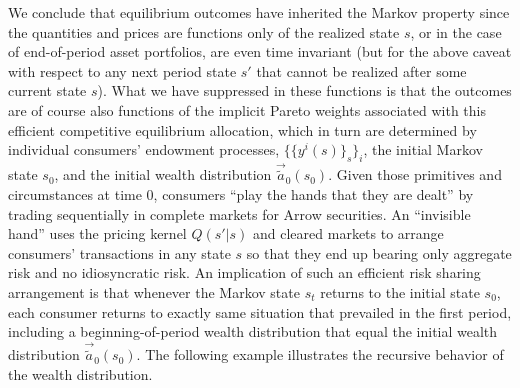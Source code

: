  
We conclude that equilibrium outcomes have
inherited the Markov property since the 
quantities and prices are functions only of 
the realized state $s$, or in the case of 
end-of-period asset portfolios, are even 
time invariant (but for the above caveat with 
respect to any next period state $s'$ that 
cannot be realized after some current 
state $s$).
What we have suppressed in these functions is 
that the outcomes are of course also functions 
of the implicit Pareto weights associated
with this efficient competitive equilibrium 
allocation, which in turn are determined by 
individual consumers' endowment processes, 
$\{\{y^i(s)\}_s\}_i$, the initial Markov 
state $s_0$, and the initial wealth distribution
$\vec {\tilde a}_0(s_0)$. Given those primitives 
and circumstances at time 0, 
consumers ``play the hands that they are dealt'' 
by trading sequentially in complete markets for 
Arrow securities. An ``invisible hand''
uses the pricing kernel $Q(s'|s)$ and cleared 
markets to arrange consumers' transactions 
in any state $s$ so that they end up bearing   only aggregate risk
and 
no idiosyncratic risk.
An implication of such an efficient risk sharing
arrangement is that whenever the Markov state $s_t$ 
returns to the initial state $s_0$, each consumer 
returns  to exactly same situation that 
prevailed in the first period, including a
beginning-of-period wealth distribution that  equal 
the initial wealth distribution
$\vec {\tilde a}_0(s_0)$. The following example
illustrates the recursive behavior of the wealth
distribution.




